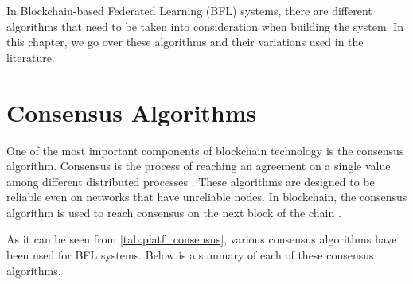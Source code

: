 In Blockchain-based Federated Learning (BFL) systems, there are different algorithms that need to be taken into consideration when building the system. In this chapter, we go over these algorithms and their variations used in the literature.

\section{Consensus Algorithms}\label{related_work:consensus_algorithms}

One of the most important components of blockchain technology is the consensus algorithm. Consensus is the process of reaching an agreement on a single value among different distributed processes \cite{9347812}. These algorithms are designed to be reliable even on networks that have unreliable nodes. In blockchain, the consensus algorithm is used to reach consensus on the next block of the chain \cite{9079513}.

As it can be seen from \autoref{tab:platf_consensus}, various consensus algorithms have been used for BFL systems. Below is a summary of each of these consensus algorithms.

